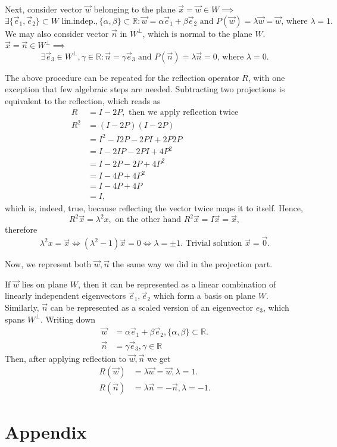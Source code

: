 \documentclass{article}
\begin{document}
Next, consider vector $\vec{w}$ belonging to the plane $\vec{x}=\vec{w}\in W\implies$
\begin{equation*}
	\exists \{\vec{e}_1,\vec{e}_2\}\subset W \text{ lin.indep.}, \{\alpha,\beta\}\subset \mathbb{R}:\vec{w}=\alpha\vec{e}_1+\beta\vec{e}_2\text{ and }P(\vec{w})=\lambda\vec{w}=\vec{w}\text{, where }\lambda=1.
\end{equation*}
We may also consider vector $\vec{n}$ in $W^\perp$, which is normal to the plane $W$. $\vec{x}=\vec{n}\in W^\perp\implies$
\begin{equation*}
	\exists \vec{e}_3\in W^\perp, \gamma \in \mathbb{R}:\vec{n}=\gamma \vec{e}_3\text{ and }P(\vec{n})=\lambda\vec{n}=0\text{, where }\lambda=0.	
\end{equation*}

The above procedure can be repeated for the reflection operator $R$, with one exception that few algebraic steps are needed. Subtracting two projections is equivalent to the reflection, which reads as
\begin{align*}
	R 	&=I-2P,\text{ then we apply reflection twice}\\
	R^2 &=(I-2P)(I-2P)\\
		&=I^2-I2P-2PI+2P2P\\
		&=I-2IP-2PI+4P^2\\
		&=I-2P-2P+4P^2\\
		&=I-4P+4P^2\\
		&=I-4P+4P\\
		&=I,
\end{align*}
which is, indeed, true, because reflecting the vector twice maps it to itself. Hence,
\begin{equation*}
	R^2\vec{x}=\lambda^2{x},\text{ on the other hand } R^2\vec{x}=I\vec{x}=\vec{x},
\end{equation*}
therefore
\begin{equation*}
	\lambda^2{x}=\vec{x}\iff\left(\lambda^2-1\right)\vec{x}=0\iff\lambda=\pm1.\text{ Trivial solution }\vec{x}=\vec{0}.
\end{equation*}

Now, we represent both $\vec{w},\vec{n}$ the same way we did in the projection part. 

If $\vec{w}$ lies on plane $W$, then it can be represented as a linear combination of linearly independent eigenvectors $\vec{e}_1,\vec{e}_2$ which form a basis on plane $W$. Similarly, $\vec{n}$ can be represented as a scaled version of an eigenvector $e_3$, which spans $W^\perp$. Writing down
\begin{align*}
	\vec{w}&=\alpha\vec{e}_1+\beta\vec{e}_2,\{\alpha,\beta\}\subset \mathbb{R}.\\
	\vec{n}&=\gamma\vec{e}_3,\gamma\in\mathbb{R}
\end{align*}
Then, after applying reflection to $\vec{w},\vec{n}$ we get
\begin{align*}
	R(\vec{w})&=\lambda\vec{w}=\vec{w},\lambda=1.\\
	R(\vec{n})&=\lambda\vec{n}=-\vec{n},\lambda=-1.
\end{align*}






\appendix

\section{Appendix}
\end{document}
